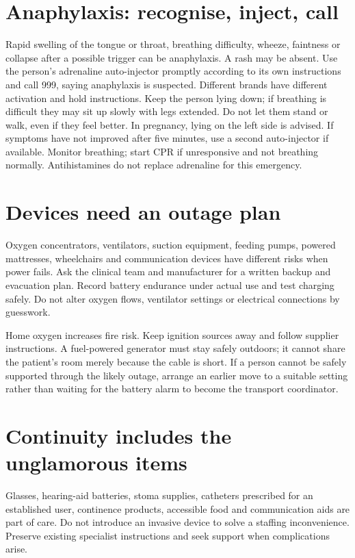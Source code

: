 \documentclass[10pt,openright]{book}
\begin{document}
\section*{Anaphylaxis: recognise, inject, call}
Rapid swelling of the tongue or throat, breathing difficulty, wheeze, faintness or collapse after a possible trigger can be anaphylaxis. A rash may be absent. Use the person's adrenaline auto-injector promptly according to its own instructions and call 999, saying anaphylaxis is suspected. Different brands have different activation and hold instructions. Keep the person lying down; if breathing is difficult they may sit up slowly with legs extended. Do not let them stand or walk, even if they feel better. In pregnancy, lying on the left side is advised. If symptoms have not improved after five minutes, use a second auto-injector if available. Monitor breathing; start CPR if unresponsive and not breathing normally. Antihistamines do not replace adrenaline for this emergency.

\section*{Devices need an outage plan}
Oxygen concentrators, ventilators, suction equipment, feeding pumps, powered mattresses, wheelchairs and communication devices have different risks when power fails. Ask the clinical team and manufacturer for a written backup and evacuation plan. Record battery endurance under actual use and test charging safely. Do not alter oxygen flows, ventilator settings or electrical connections by guesswork.

Home oxygen increases fire risk. Keep ignition sources away and follow supplier instructions. A fuel-powered generator must stay safely outdoors; it cannot share the patient's room merely because the cable is short. If a person cannot be safely supported through the likely outage, arrange an earlier move to a suitable setting rather than waiting for the battery alarm to become the transport coordinator.

\section*{Continuity includes the unglamorous items}
Glasses, hearing-aid batteries, stoma supplies, catheters prescribed for an established user, continence products, accessible food and communication aids are part of care. Do not introduce an invasive device to solve a staffing inconvenience. Preserve existing specialist instructions and seek support when complications arise.
\end{document}
